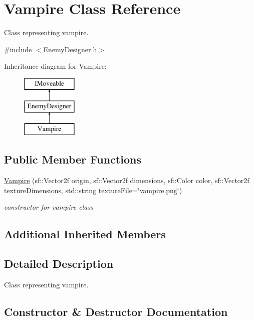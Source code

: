 \hypertarget{class_vampire}{}\section{Vampire Class Reference}
\label{class_vampire}


Class representing vampire.  




{\ttfamily \#include $<$Enemy\+Designer.\+h$>$}

Inheritance diagram for Vampire\+:\begin{figure}[H]
\begin{center}
\leavevmode
\includegraphics[height=3.000000cm]{class_vampire}
\end{center}
\end{figure}
\subsection*{Public Member Functions}
\begin{DoxyCompactItemize}
\item 
\mbox{\hyperlink{class_vampire_a5e4b1003b26311f3c248f87e6871ceb5}{Vampire}} (sf\+::\+Vector2f origin, sf\+::\+Vector2f dimensions, sf\+::\+Color color, sf\+::\+Vector2f texture\+Dimensions, std\+::string texture\+File=\char`\"{}vampire.\+png\char`\"{})
\begin{DoxyCompactList}\small\item\em constructor for vampire class \end{DoxyCompactList}\end{DoxyCompactItemize}
\subsection*{Additional Inherited Members}


\subsection{Detailed Description}
Class representing vampire. 

\subsection{Constructor \& Destructor Documentation}
\mbox{\label{class_vampire_a5e4b1003b26311f3c248f87e6871ceb5}} 
